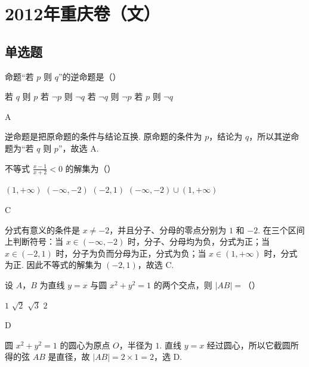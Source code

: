 \chapter{2012年重庆卷（文）}

\section{单选题}

\begin{problem}
命题“若 \(p\) 则 \(q\)”的逆命题是（\quad）

\choices
    {若 \(q\) 则 \(p\)}
    {若 \(\lnot p\) 则 \(\lnot q\)}
    {若 \(\lnot q\) 则 \(\lnot p\)}
    {若 \(p\) 则 \(\lnot q\)}

\begin{answer}
A
\end{answer}

\begin{solution}
逆命题是把原命题的条件与结论互换. 原命题的条件为 \(p\)，结论为 \(q\)，所以其逆命题为“若 \(q\) 则 \(p\)”，故选 A.
\end{solution}
\end{problem}

\begin{problem}
不等式 \(\frac{x-1}{x+2}<0\) 的解集为（\quad）

\choices
    {\((1,+\infty)\)}
    {\((-\infty,-2)\)}
    {\((-2,1)\)}
    {\((-\infty,-2)\cup(1,+\infty)\)}

\begin{answer}
C
\end{answer}

\begin{solution}
分式有意义的条件是 \(x\ne-2\)，并且分子、分母的零点分别为 \(1\) 和 \(-2\). 在三个区间上判断符号：当 \(x\in(-\infty,-2)\) 时，分子、分母均为负，分式为正；当 \(x\in(-2,1)\) 时，分子为负而分母为正，分式为负；当 \(x\in(1,+\infty)\) 时，分式为正. 因此不等式的解集为 \((-2,1)\)，故选 C.
\end{solution}
\end{problem}

\begin{problem}
设 \(A\)，\(B\) 为直线 \(y=x\) 与圆 \(x^2+y^2=1\) 的两个交点，则 \(|AB|=\)（\quad）

\choices
    {\(1\)}
    {\(\sqrt{2}\)}
    {\(\sqrt{3}\)}
    {\(2\)}

\begin{answer}
D
\end{answer}

\begin{solution}
圆 \(x^2+y^2=1\) 的圆心为原点 \(O\)，半径为 \(1\). 直线 \(y=x\) 经过圆心，所以它截圆所得的弦 \(AB\) 是直径，故 \(|AB|=2\times1=2\)，选 D.
\end{solution}
\end{problem}

